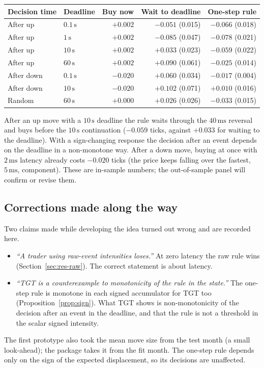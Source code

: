\documentclass[11pt]{article}
\theoremstyle{definition}
\theoremstyle{remark}
\newcommand{\ms}{\,\text{ms}}
\newcommand{\sx}{\,\text{s}}
\begin{document}
\begin{center}
\small
\begin{tabular}{@{}llrrr@{}}
\toprule
Decision time & Deadline & Buy now & Wait to deadline & One-step rule \\
\midrule
After up & $0.1\sx$ & $+0.002$ & $-0.051$ (0.015) & $\mathbf{-0.066}$ (0.018) \\
After up & $1\sx$ & $+0.002$ & $-0.085$ (0.047) & $\mathbf{-0.078}$ (0.021) \\
After up & $10\sx$ & $+0.002$ & $+0.033$ (0.023) & $\mathbf{-0.059}$ (0.022) \\
After up & $60\sx$ & $+0.002$ & $+0.090$ (0.061) & $\mathbf{-0.025}$ (0.014) \\
After down & $0.1\sx$ & $-0.020$ & $+0.060$ (0.034) & $-0.017$ (0.004) \\
After down & $10\sx$ & $-0.020$ & $+0.102$ (0.071) & $+0.010$ (0.016) \\
Random & $60\sx$ & $+0.000$ & $+0.026$ (0.026) & $\mathbf{-0.033}$ (0.015) \\
\bottomrule
\end{tabular}
\end{center}

\noindent After an up move with a $10\sx$ deadline the rule waits through the $40\ms$ reversal and buys before the $10\sx$ continuation ($-0.059$ ticks, against $+0.033$ for waiting to the deadline). With a sign-changing response the decision after an event depends on the deadline in a non-monotone way. After a down move, buying at once with $2\ms$ latency already costs $-0.020$ ticks (the price keeps falling over the fastest, $5\ms$, component). These are in-sample numbers; the out-of-sample panel will confirm or revise them.

\subsection{Corrections made along the way}

Two claims made while developing the idea turned out wrong and are recorded here.
\begin{itemize}
\item \emph{``A trader using raw-event intensities loses.''} At zero latency the raw rule wins (Section~\ref{sec:res-raw}). The correct statement is about latency.
\item \emph{``TGT is a counterexample to monotonicity of the rule in the state.''} The one-step rule is monotone in each signed accumulator for TGT too (Proposition~\ref{prop:sign}). What TGT shows is non-monotonicity of the decision after an event in the deadline, and that the rule is not a threshold in the scalar signed intensity.
\end{itemize}
The first prototype also took the mean move size from the test month (a small look-ahead); the package takes it from the fit month. The one-step rule depends only on the sign of the expected displacement, so its decisions are unaffected.
\end{document}
